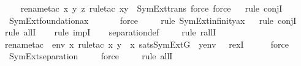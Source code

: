 \begin{isabellebody}
\ \ \ \isamarkupfalse%
{\isacharparenleft}{\kern0pt}rename{\isacharunderscore}{\kern0pt}tac\ x\ y\ z{\isacharcomma}{\kern0pt}\ rule{\isacharunderscore}{\kern0pt}tac\ x{\isacharequal}{\kern0pt}y\ \ SymExt{\isacharunderscore}{\kern0pt}trans{\isacharcomma}{\kern0pt}\ force{\isacharcomma}{\kern0pt}\ force{\isacharparenright}{\kern0pt}\isanewline
\ \ \isamarkupfalse%
{\isacharparenleft}{\kern0pt}rule\ conjI{\isacharparenright}{\kern0pt}{\isacharplus}{\kern0pt}\isanewline
\ \ \isamarkupfalse%
\ SymExt{\isacharunderscore}{\kern0pt}foundation{\isacharunderscore}{\kern0pt}ax\ \isanewline
\ \ \ \ \isamarkupfalse%
\ force\ \isanewline
\ \ \ \isamarkupfalse%
{\isacharparenleft}{\kern0pt}rule\ SymExt{\isacharunderscore}{\kern0pt}infinity{\isacharunderscore}{\kern0pt}ax{\isacharparenright}{\kern0pt}\isanewline
\ \ \isamarkupfalse%
{\isacharparenleft}{\kern0pt}rule\ conjI{\isacharparenright}{\kern0pt}\isanewline
\ \ \ \isamarkupfalse%
{\isacharparenleft}{\kern0pt}rule\ allI{\isacharparenright}{\kern0pt}{\isacharplus}{\kern0pt}\isanewline
\ \ \ \isamarkupfalse%
{\isacharparenleft}{\kern0pt}rule\ impI{\isacharparenright}{\kern0pt}{\isacharplus}{\kern0pt}\isanewline
\ \ \isamarkupfalse%
\ separation{\isacharunderscore}{\kern0pt}def\ \isanewline
\ \ \ \isamarkupfalse%
{\isacharparenleft}{\kern0pt}rule\ rallI{\isacharparenright}{\kern0pt}\isanewline
\ \ \ \isamarkupfalse%
{\isacharparenleft}{\kern0pt}rename{\isacharunderscore}{\kern0pt}tac\ {\isasymphi}\ env\ x{\isacharcomma}{\kern0pt}\ rule{\isacharunderscore}{\kern0pt}tac\ x{\isacharequal}{\kern0pt}{\isachardoublequoteopen}{\isacharbraceleft}{\kern0pt}\ y\ {\isasymin}\ x{\isachardot}{\kern0pt}\ sats{\isacharparenleft}{\kern0pt}SymExt{\isacharparenleft}{\kern0pt}G{\isacharparenright}{\kern0pt}{\isacharcomma}{\kern0pt}\ {\isasymphi}{\isacharcomma}{\kern0pt}\ {\isacharbrackleft}{\kern0pt}y{\isacharbrackright}{\kern0pt}{\isacharat}{\kern0pt}env{\isacharparenright}{\kern0pt}\ {\isacharbraceright}{\kern0pt}{\isachardoublequoteclose}\ \ rexI{\isacharparenright}{\kern0pt}\isanewline
\ \ \ \ \isamarkupfalse%
\ force\ \isanewline
\ \ \isamarkupfalse%
\ SymExt{\isacharunderscore}{\kern0pt}separation\isanewline
\ \ \ \isamarkupfalse%
\ force\ \isanewline
\ \ \ \isamarkupfalse%
{\isacharparenleft}{\kern0pt}rule\ allI{\isacharparenright}{\kern0pt}{\isacharplus}{\kern0pt}\isanewline

\end{isabellebody}
